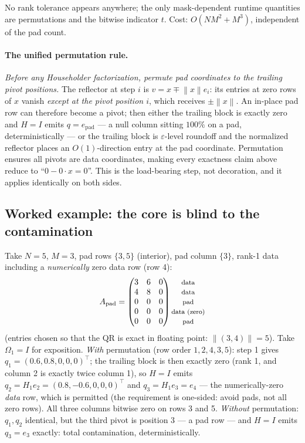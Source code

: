 \documentclass[11pt]{article}
\newcommand{\Apad}{A_{\mathrm{pad}}}
\newcommand{\norm}[1]{\left\lVert #1 \right\rVert}
\begin{document}
No rank tolerance appears anywhere; the only mask-dependent runtime
quantities are permutations and the bitwise indicator $t$. Cost:
$O(NM^2 + M^3)$, independent of the pad count.

\paragraph{The unified permutation rule.} \emph{Before any Householder
factorization, permute pad coordinates to the trailing pivot positions.} The
reflector at step $i$ is $v = x \mp \norm{x} e_i$: its entries at zero rows of
$x$ vanish \emph{except at the pivot position $i$}, which receives
$\pm\norm{x}$. An in-place pad row can therefore become a pivot; then either
the trailing block is exactly zero and $H = I$ emits $q = e_{\mathrm{pad}}$
--- a null column sitting $100\%$ on a pad, deterministically --- or the
trailing block is $\varepsilon$-level roundoff and the normalized reflector
places an $O(1)$-direction entry at the pad coordinate. Permutation ensures
all pivots are data coordinates, making every exactness claim above reduce to
``$0 - 0\cdot x = 0$''. This is the load-bearing step, not decoration, and it
applies identically on both sides.

\subsection*{Worked example: the core is blind to the contamination}

Take $N = 5$, $M = 3$, pad rows $\{3, 5\}$ (interior), pad column $\{3\}$,
rank-1 data including a \emph{numerically} zero data row (row 4):
\[
  \Apad =
  \begin{pmatrix}
    3 & 6 & 0\\ 4 & 8 & 0\\ 0 & 0 & 0\\ 0 & 0 & 0\\ 0 & 0 & 0
  \end{pmatrix}
  \begin{matrix} \text{\footnotesize data}\\ \text{\footnotesize data}\\
  \text{\footnotesize pad}\\ \text{\footnotesize data (zero)}\\
  \text{\footnotesize pad}\end{matrix}
\]
(entries chosen so that the QR is exact in floating point:
$\norm{(3,4)} = 5$). Take $\Omega_1 = I$ for exposition. \emph{With}
permutation (row order $1,2,4,3,5$): step 1 gives
$q_1 = (0.6, 0.8, 0, 0, 0)^{\top}$; the trailing block is then exactly zero
(rank 1, and column 2 is exactly twice column 1), so $H = I$ emits
$q_2 = H_1 e_2 = (0.8, -0.6, 0, 0, 0)^{\top}$ and $q_3 = H_1 e_3 = e_4$
--- the numerically-zero \emph{data} row, which is permitted (the requirement
is one-sided: avoid pads, not all zero rows). All three columns bitwise zero
on rows 3 and 5. \emph{Without} permutation: $q_1, q_2$ identical, but the
third pivot is position 3 --- a pad row --- and $H = I$ emits
$q_3 = e_3$ exactly: total contamination, deterministically.
\end{document}
